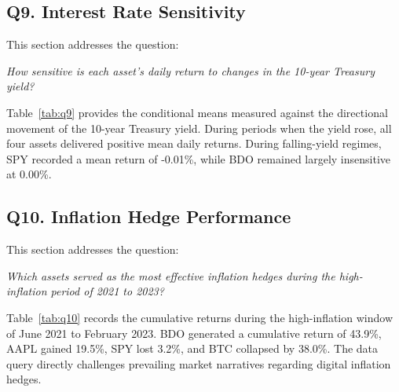 \subsection{Q9. Interest Rate Sensitivity}

This section addresses the question:

\noindent\textit{How sensitive is each asset's daily return to changes in the 10-year Treasury yield?}



Table~\ref{tab:q9} provides the conditional means measured against the directional movement of the 10-year Treasury yield. During periods when the yield rose, all four assets delivered positive mean daily returns. During falling-yield regimes, SPY recorded a mean return of -0.01\%, while BDO remained largely insensitive at 0.00\%.

\subsection{Q10. Inflation Hedge Performance}

This section addresses the question:

\noindent\textit{Which assets served as the most effective inflation hedges during the high-inflation period of 2021 to 2023?}



Table~\ref{tab:q10} records the cumulative returns during the high-inflation window of June 2021 to February 2023. BDO generated a cumulative return of 43.9\%, AAPL gained 19.5\%, SPY lost 3.2\%, and BTC collapsed by 38.0\%. The data query directly challenges prevailing market narratives regarding digital inflation hedges.
